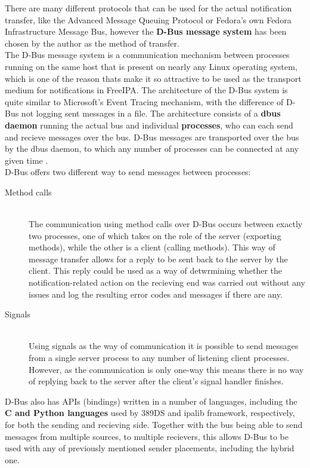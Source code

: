 There are many different protocols that can be used for the actual notification transfer, like the Advanced Message Queuing Protocol or Fedora's own Fedora Infrastructure Message Bus,
however the \textbf{D-Bus message system} has been chosen by the author as the method of transfer.\\
The D-Bus message system is a communication mechanism between processes running on the same host that is present on nearly any Linux operating system,
which is one of the reason thats make it so attractive to be used as the transport medium for notifications in FreeIPA.
The architecture of the D-Bus system is quite similar to Microsoft's Event Tracing mechanism, with the difference of D-Bus not logging sent messages in a file.
The architecture consists of a \textbf{dbus daemon} running the actual bus and individual \textbf{processes}, who can each send and recieve messages over the bus.
D-Bus messages are transported over the bus by the dbus daemon, to which any number of processes can be connected at any given time \cite{dbusWeb}. \\
D-Bus offers two different way to send messages between processes:
\begin{description}
    \item[Method calls]\hfill \\
        The communication using method calls over D-Bus occurs between exactly two processes, one of which takes on the role of the server (exporting methods), while the other is a client (calling methods).
        This way of message transfer allows for a reply to be sent back to the server by the client. This reply could be used as a way of detwrmining whether the notification-related action on the recieving end
        was carried out without any issues and log the resulting error codes and messages if there are any.\\
    \item[Signals]\hfill \\
        Using signals as the way of communication it is possible to send messages from a single server process to any number of listening client processes. However, as the communication is only one-way
        this means there is no way of replying back to the server after the client's signal handler finishes.
\end{description}
D-Bus also has APIs (bindings) written in a number of languages, including the \textbf{C and Python languages} used by 389DS and ipalib framework, respectively, for both the sending and recieving side.
Together with the bus being able to send messages from multiple sources, to multiple recievers, this allows D-Bus to be used with any of previously mentioned sender placements, including the hybrid one. \\
